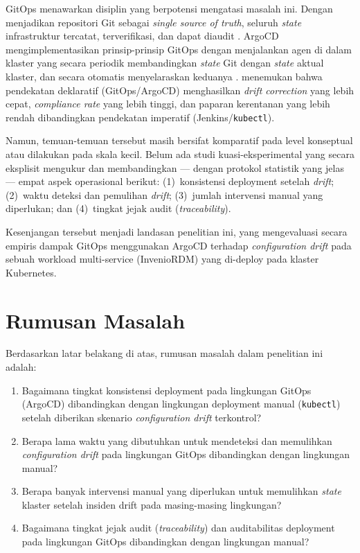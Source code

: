 GitOps menawarkan disiplin yang berpotensi mengatasi masalah ini. Dengan menjadikan repositori Git sebagai \textit{single source of truth}, seluruh \textit{state} infrastruktur tercatat, terverifikasi, dan dapat diaudit \citep{opengitops2021}. ArgoCD mengimplementasikan prinsip-prinsip GitOps dengan menjalankan agen di dalam klaster yang secara periodik membandingkan \textit{state} Git dengan \textit{state} aktual klaster, dan secara otomatis menyelaraskan keduanya \citep{argocd2024}. \citet{kaggantinataraja2025security} menemukan bahwa pendekatan deklaratif (GitOps/ArgoCD) menghasilkan \textit{drift correction} yang lebih cepat, \textit{compliance rate} yang lebih tinggi, dan paparan kerentanan yang lebih rendah dibandingkan pendekatan imperatif (Jenkins/\texttt{kubectl}).

Namun, temuan-temuan tersebut masih bersifat komparatif pada level konseptual atau dilakukan pada skala kecil. Belum ada studi kuasi-eksperimental yang secara eksplisit mengukur dan membandingkan --- dengan protokol statistik yang jelas --- empat aspek operasional berikut: (1)~konsistensi deployment setelah \textit{drift}; (2)~waktu deteksi dan pemulihan \textit{drift}; (3)~jumlah intervensi manual yang diperlukan; dan (4)~tingkat jejak audit (\textit{traceability}).

Kesenjangan tersebut menjadi landasan penelitian ini, yang mengevaluasi secara empiris dampak GitOps menggunakan ArgoCD terhadap \textit{configuration drift} pada sebuah workload multi-service (InvenioRDM) yang di-deploy pada klaster Kubernetes.

\section{Rumusan Masalah}

Berdasarkan latar belakang di atas, rumusan masalah dalam penelitian ini adalah:

\begin{enumerate}
  \item Bagaimana tingkat konsistensi deployment pada lingkungan GitOps (ArgoCD) dibandingkan dengan lingkungan deployment manual (\texttt{kubectl}) setelah diberikan skenario \textit{configuration drift} terkontrol?
  \item Berapa lama waktu yang dibutuhkan untuk mendeteksi dan memulihkan \textit{configuration drift} pada lingkungan GitOps dibandingkan dengan lingkungan manual?
  \item Berapa banyak intervensi manual yang diperlukan untuk memulihkan \textit{state} klaster setelah insiden drift pada masing-masing lingkungan?
  \item Bagaimana tingkat jejak audit (\textit{traceability}) dan auditabilitas deployment pada lingkungan GitOps dibandingkan dengan lingkungan manual?
\end{enumerate}

